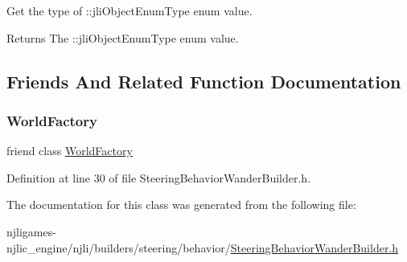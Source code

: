 Get the type of \+::jli\+Object\+Enum\+Type enum value.

\begin{DoxyReturn}{Returns}
The \+::jli\+Object\+Enum\+Type enum value. 
\end{DoxyReturn}


\subsection{Friends And Related Function Documentation}
\mbox{\label{classnjli_1_1_steering_behavior_wander_builder_acb96ebb09abe8f2a37a915a842babfac}} 
\subsubsection{\texorpdfstring{World\+Factory}{WorldFactory}}
{\footnotesize\ttfamily friend class \mbox{\hyperlink{classnjli_1_1_world_factory}{World\+Factory}}\hspace{0.3cm}{\ttfamily [friend]}}



Definition at line 30 of file Steering\+Behavior\+Wander\+Builder.\+h.



The documentation for this class was generated from the following file\+:\begin{DoxyCompactItemize}
\item 
njligames-\/njlic\+\_\+engine/njli/builders/steering/behavior/\mbox{\hyperlink{_steering_behavior_wander_builder_8h}{Steering\+Behavior\+Wander\+Builder.\+h}}\end{DoxyCompactItemize}
